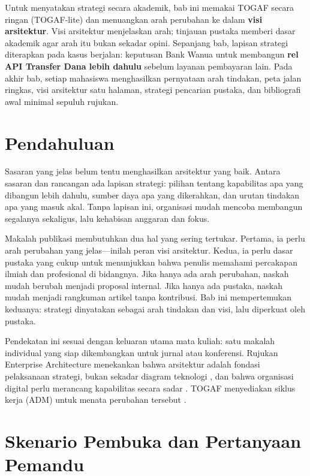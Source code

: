 Untuk menyatakan strategi secara akademik, bab ini memakai TOGAF secara ringan
(TOGAF-lite) dan menuangkan arah perubahan ke dalam \textbf{visi arsitektur}.
Visi arsitektur menjelaskan arah; tinjauan pustaka memberi dasar akademik agar
arah itu bukan sekadar opini. Sepanjang bab, lapisan strategi diterapkan pada
kasus berjalan: keputusan Bank Wanua untuk membangun \textbf{rel API Transfer
Dana lebih dahulu} sebelum layanan pembayaran lain. Pada akhir bab, setiap
mahasiswa menghasilkan pernyataan arah tindakan, peta jalan ringkas, visi
arsitektur satu halaman, strategi pencarian pustaka, dan bibliografi awal
minimal sepuluh rujukan.

\section{Pendahuluan}

Sasaran yang jelas belum tentu menghasilkan arsitektur yang baik. Antara
sasaran dan rancangan ada lapisan strategi: pilihan tentang kapabilitas apa
yang dibangun lebih dahulu, sumber daya apa yang dikerahkan, dan urutan
tindakan apa yang masuk akal. Tanpa lapisan ini, organisasi mudah mencoba
membangun segalanya sekaligus, lalu kehabisan anggaran dan fokus.

Makalah publikasi membutuhkan dua hal yang sering tertukar. Pertama, ia perlu
arah perubahan yang jelas---inilah peran visi arsitektur. Kedua, ia perlu dasar
pustaka yang cukup untuk menunjukkan bahwa penulis memahami percakapan ilmiah
dan profesional di bidangnya. Jika hanya ada arah perubahan, naskah mudah
berubah menjadi proposal internal. Jika hanya ada pustaka, naskah mudah menjadi
rangkuman artikel tanpa kontribusi. Bab ini mempertemukan keduanya: strategi
dinyatakan sebagai arah tindakan dan visi, lalu diperkuat oleh pustaka.

Pendekatan ini sesuai dengan keluaran utama mata kuliah: satu makalah
individual yang siap dikembangkan untuk jurnal atau konferensi. Rujukan
Enterprise Architecture menekankan bahwa arsitektur adalah fondasi pelaksanaan
strategi, bukan sekadar diagram teknologi \cite{ross2006enterprise}, dan bahwa
organisasi digital perlu merancang kapabilitas secara sadar \cite{ross2019designed}.
TOGAF menyediakan siklus kerja (ADM) untuk menata perubahan tersebut
\cite{togaf10}.

\section{Skenario Pembuka dan Pertanyaan Pemandu}

